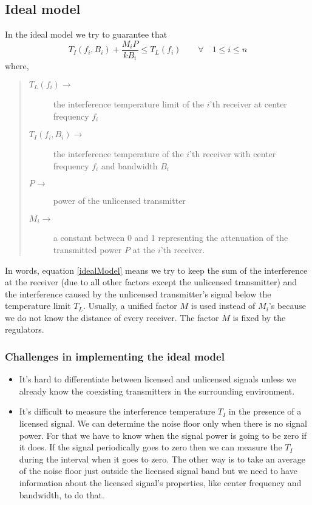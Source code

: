 \documentclass[12pt]{article}
\begin{document}
\subsection{Ideal model}

In the ideal model we try to guarantee that
\begin{equation}
    T_I(f_i,B_i) + \frac{M_iP}{kB_i} \leq T_L(f_i) \qquad \forall \quad 1 \leq i \leq n \label{idealModel}
\end{equation}
where,
\begin{quote}
\begin{description}
    \item[$T_L(f_i)\longrightarrow$] the interference temperature limit of the $i$'th receiver at center frequency $f_i$
    \item[$T_I(f_i,B_i)\longrightarrow$] the interference temperature of the $i$'th receiver with center frequency $f_i$ and bandwidth $B_i$
    \item[$P\longrightarrow$] power of the unlicensed transmitter
    \item[$M_i\longrightarrow$] a constant between 0 and 1 representing the attenuation of the  transmitted power $P$ at the $i$'th receiver.
\end{description}
\end{quote}

In words, equation \eqref{idealModel} means we try to keep the sum of the interference at the receiver (due to all other factors except the unlicensed transmitter) and the interference caused by the unlicensed transmitter's signal below the temperature limit $T_L$. Usually, a unified factor $M$ is used instead of $M_i$'s because we do not know the distance of every receiver. The factor $M$ is fixed by the regulators.

\subsubsection*{Challenges in implementing the ideal model}

\begin{itemize}
    \item It's hard to differentiate between licensed and unlicensed signals unless we already know the coexisting transmitters in the surrounding environment.
    \item It's difficult to measure the interference temperature $T_I$ in the presence of a licensed signal. We can determine the noise floor only when there is no signal power. For that we have to know when the signal power is going to be zero if it does. If the signal periodically goes to zero then we can measure the $T_I$ during the interval when it goes to zero. The other way is to take an average of the noise floor just outside the licensed signal band but we need to have information about the licensed signal's properties, like center frequency and bandwidth, to do that.
\end{itemize}
\end{document}
